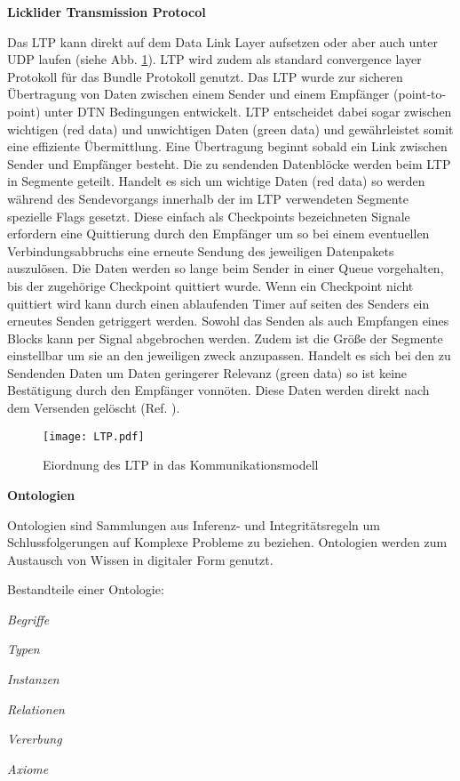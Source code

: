 
\textbf{Licklider Transmission Protocol}

Das LTP kann direkt auf dem Data Link Layer aufsetzen oder aber auch unter UDP
laufen (siehe Abb. \ref{fig:LTP}). LTP wird zudem als standard convergence layer
Protokoll f{\"u}r das Bundle Protokoll genutzt. Das LTP wurde zur sicheren {\"U}bertragung von Daten
zwischen einem Sender und einem Empf{\"a}nger (point-to-point) unter DTN Bedingungen entwickelt. LTP entscheidet dabei sogar zwischen wichtigen
(red data) und unwichtigen Daten (green data) und gew{\"a}hrleistet somit eine
effiziente {\"U}bermittlung. Eine {\"U}bertragung beginnt sobald ein Link zwischen Sender und Empf{\"a}nger
besteht. Die zu sendenden Datenbl{\"o}cke werden beim LTP in Segmente
geteilt. Handelt es sich um wichtige Daten (red data) so werden w{\"a}hrend des
Sendevorgangs innerhalb der im LTP verwendeten Segmente spezielle Flags gesetzt.
Diese einfach als Checkpoints bezeichneten Signale erfordern eine Quittierung durch den Empf{\"a}nger um so bei einem eventuellen
Verbindungsabbruchs eine erneute Sendung des jeweiligen Datenpakets
auszul{\"o}sen. Die Daten werden so lange beim Sender in einer Queue
vorgehalten, bis der zugeh{\"o}rige Checkpoint quittiert wurde. Wenn ein
Checkpoint nicht quittiert wird kann durch einen ablaufenden Timer auf seiten
des Senders ein erneutes Senden getriggert werden. Sowohl das Senden als auch
Empfangen eines Blocks kann per Signal abgebrochen werden. Zudem ist die
Gr{\"o}{\ss}e der Segmente einstellbar um sie an den jeweiligen zweck
anzupassen. Handelt es sich bei den zu Sendenden Daten um Daten geringerer
Relevanz (green data) so ist keine Best{\"a}tigung durch den Empf{\"a}nger
vonn{\"o}ten.
Diese Daten werden direkt nach dem Versenden gel{\"o}scht (Ref. \cite{web4}).

\begin{figure}[H]
\centering
\texttt{[image: LTP.pdf]}
\caption{Eiordnung des LTP in das Kommunikationsmodell}
\label{fig:LTP}
\end{figure}

\textbf{Ontologien}

Ontologien sind Sammlungen aus Inferenz- und Integrit{\"a}tsregeln um
Schlussfolgerungen auf Komplexe Probleme zu beziehen. Ontologien werden zum
Austausch von Wissen in digitaler Form genutzt.

Bestandteile einer Ontologie:

 \begin{compactenum}[I]
     \item \textit{Begriffe}
     \item \textit{Typen}
     \item \textit{Instanzen}
     \item \textit{Relationen}
     \item \textit{Vererbung}
     \item \textit{Axiome}
   \end{compactenum}

